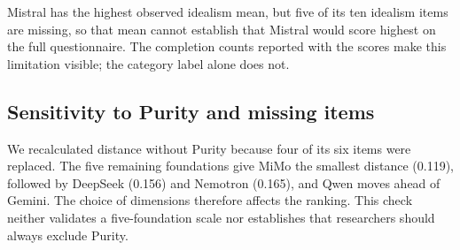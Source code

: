 \documentclass[11pt]{article}
\begin{document}
Mistral has the highest observed idealism mean, but five of its ten idealism items are missing, so that mean cannot establish that Mistral would score highest on the full questionnaire. The completion counts reported with the scores make this limitation visible; the category label alone does not.

\begin{table}[htbp]
\centering\small
{}
\caption{EPQ observed means, midpoint categories, and numeric-item coverage. Scale range is 1 to 9.}\label{tab:epq}
\end{table}

\subsection{Sensitivity to Purity and missing items}
We recalculated distance without Purity because four of its six items were replaced. The five remaining foundations give MiMo the smallest distance (0.119), followed by DeepSeek (0.156) and Nemotron (0.165), and Qwen moves ahead of Gemini. The choice of dimensions therefore affects the ranking. This check neither validates a five-foundation scale nor establishes that researchers should always exclude Purity.
\end{document}
